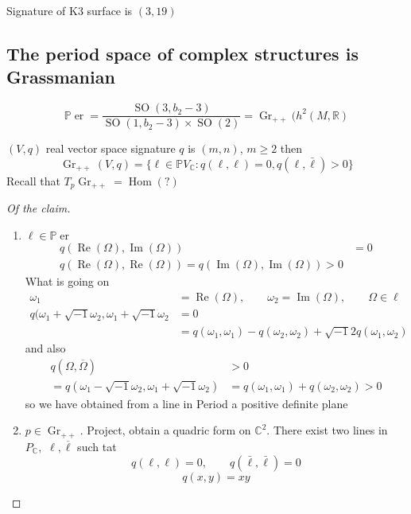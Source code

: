 \begin{coro}
	Signature of K3 surface is $(3,19)$
\end{coro}

\subsection{The period space of complex structures is Grassmanian}

\begin{claim}
\[\mathbb{P}\operatorname{er}=\dfrac{\operatorname{SO}(3,b_2-3)}{\operatorname{SO}(1,b_2-3) \times \operatorname{SO}(2)}=\operatorname{Gr}_{++}(h^{2}(M,\mathbb{R})\]
\end{claim}

\begin{remark}
	$(V,q)$ real vector space signature $q$ is $(m,n)$, $m\geq 2$ then
\[\operatorname{Gr}_{++}(V,q)=\{\ell\in\mathbb{P}V_{\mathbb{C}}:q(\ell,\ell)=0,q(\ell,\bar{\ell})>0\} \]
Recall that
$T_p\operatorname{Gr}_{++}=\operatorname{Hom}(?)$
\end{remark}

\begin{proof}[Of the claim]\leavevmode 
	\begin{enumerate}[label=\textbf{Step \arabic*}]
		\item $\ell\in\mathbb{P}\operatorname{er}$
		\begin{align*}
			q(\operatorname{Re}(\Omega),\operatorname{Im}(\Omega))&=0\\
			q(\operatorname{Re}(\Omega),\operatorname{Re}(\Omega))=q(\operatorname{Im}(\Omega),\operatorname{Im}(\Omega))>0
		\end{align*}
		What is going on
		\begin{align*}
			\omega_1&=\operatorname{Re}(\Omega),\qquad \omega_2=\operatorname{Im}(\Omega),\qquad \Omega \in\ell\\
			q(\omega_1+\sqrt{-1} \omega_2,\omega_1+\sqrt{-1}\omega_2&=0\\
			&=q(\omega_1,\omega_1)-q(\omega_2,\omega_2)+\sqrt{-1} 2q(\omega_1,\omega_2)
		\end{align*}
		and also 
		\begin{align*}
			q(\Omega,\overline{\Omega})&>0\\
			=q(\omega_1-\sqrt{-1}\omega_2,\omega_1+\sqrt{-1}\omega_2)&=q(\omega_1,\omega_1)+q(\omega_2,\omega_2)>0
		\end{align*}
		so we have obtained from a line in Period a positive definite plane

		\item $p\in\operatorname{Gr}_{++}$. Project, obtain a quadric form on $\mathbb{C}^2$.
			There exist two lines in $P_{\mathbb{C}}, $ $ \ell,\overline{ \ell}$ such tat
			\[q(\ell,\ell)=0, \qquad q(\bar{\ell},\bar{\ell})=0  \]
			\[q(x,y)=xy\]
	\end{enumerate}
\end{proof}

